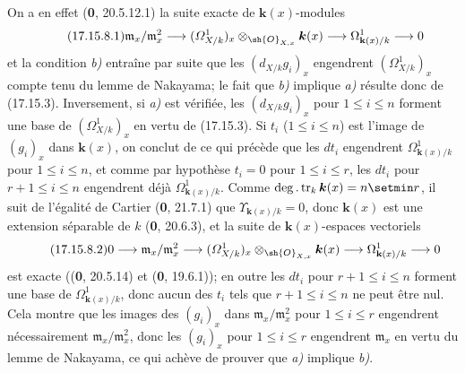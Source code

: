 On a en effet (\textbf{0}, 20.5.12.1) la suite exacte de $\boldsymbol{k}(x)$-modules
\[
\label{IV.17.15.8.1}
\tag{17.15.8.1}
\mathfrak m_x/\mathfrak m_x^2\to(\varOmega^1_{X/k})_x\otimes_{\sh{O}_{X,x}}\boldsymbol{k}(x)\to\Omega^1_{\mathbf{k}(x)/k}\to0
\]
et la condition \emph{b)} entraîne par suite que les $(d_{X/k}g_i)_x$ engendrent $(\varOmega^1_{X/k})_x$ compte tenu du lemme de Nakayama; le fait que \emph{b)} implique \emph{a)} résulte donc de (17.15.3). Inversement, si \emph{a)} est vérifiée, les $(d_{X/k}g_i)_x$ pour $1\leq i\leq n$ forment une base de $(\varOmega^1_{X/k})_x$ en vertu de (17.15.3). Si $t_i$ ($1\leq i\leq n$) est l'image de $(g_i)_x$ dans $\boldsymbol{k}(x)$, on conclut de ce qui précède que les $dt_i$ engendrent $\Omega^1_{\mathbf{k}(x)/k}$ pour $1\leq i\leq n$, et comme par hypothèse $t_i=0$ pour $1\leq i\leq r$, les $dt_i$ pour $r+1\leq i\leq n$ engendrent déjà $\Omega^1_{\mathbf{k}(x)/k}$. Comme $\deg.\operatorname{tr}_k \boldsymbol{k}(x)=n\setmin r$, il suit de l'égalité de Cartier (\textbf{0}, 21.7.1) que $\Upsilon_{\mathbf{k}(x)/k}=0$, donc $\boldsymbol{k}(x)$ est une extension séparable de $k$ (\textbf{0}, 20.6.3), et la suite de $\boldsymbol{k}(x)$-espaces vectoriels
\[
\label{IV.17.15.8.2}
\tag{17.15.8.2}
0\to\mathfrak m_x/\mathfrak m_x^2\to(\varOmega^1_{X/k})_x\otimes_{\sh{O}_{X,x}}\boldsymbol{k}(x)\to\Omega^1_{\mathbf{k}(x)/k}\to0
\]
est exacte ((\textbf{0}, 20.5.14) et (\textbf{0}, 19.6.1)); en outre les $dt_i$ pour $r+1\leq i\leq n$ forment une base de $\Omega^1_{\mathbf{k}(x)/k}$, donc aucun des $t_i$ tels que $r+1\leq i\leq n$ ne peut être nul. Cela montre que les images des $(g_i)_x$ dans $\mathfrak m_x/\mathfrak m_x^2$ pour $1\leq i\leq r$ engendrent nécessairement $\mathfrak m_x/\mathfrak m_x^2$, donc les $(g_i)_x$ pour $1\leq i\leq r$ engendrent $\mathfrak m_x$ en vertu du lemme de Nakayama, ce qui achève de prouver que \emph{a)} implique \emph{b)}.

